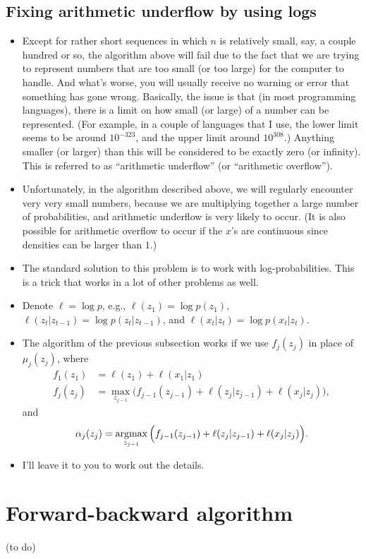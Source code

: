 \documentclass[12pt]{article}
\begin{document}
\subsection{Fixing arithmetic underflow by using logs}
\begin{itemize}
\item Except for rather short sequences in which $n$ is relatively small, say, a couple hundred or so, the algorithm above will fail due to the fact that we are trying to represent numbers that are too small (or too large) for the computer to handle. And what's worse, you will usually  receive no warning or error that something has gone wrong. Basically, the issue is that (in most programming languages), there is a limit on how small (or large) of a number can be represented. (For example, in a couple of languages that I use, the lower limit seems to be around $10^{-323}$, and the upper limit around $10^{308}$.) Anything smaller (or larger) than this will be considered to be exactly zero (or infinity). This is referred to as ``arithmetic underflow'' (or ``arithmetic overflow'').
\item Unfortunately, in the algorithm described above, we will regularly encounter very very small numbers, because we are multiplying together a large number of probabilities, and arithmetic underflow is very likely to occur.  (It is also possible for arithmetic overflow to occur if the $x$'s are continuous since densities can be larger than $1$.)
\item The standard solution to this problem is to work with log-probabilities. This is a trick that works in a lot of other problems as well.
\item Denote $\ell = \log p$, e.g., $\ell(z_1) = \log p(z_1)$, $\ell(z_t | z_{t -1}) = \log p(z_t | z_{t-1})$, and $\ell(x_t | z_t) = \log p(x_t | z_t)$.
\item The algorithm of the previous subsection works if we use $f_j(z_j)$ in place of $\mu_j(z_j)$, where
\begin{align*}
f_1(z_1) &= \ell(z_1) + \ell(x_1 | z_1) \\
f_j(z_j) &= \max_{z_{j-1}} \Big(f_{j-1}(z_{j-1}) + \ell(z_j | z_{j-1}) + \ell(x_j | z_j) \Big),
\end{align*}
and 
$$ \alpha_j(z_j) = \operatorname*{argmax}_{z_{j-1}} \Big(f_{j-1}(z_{j-1}) + \ell(z_j | z_{j-1}) + \ell(x_j | z_j) \Big).$$
\item I'll leave it to you to work out the details.
\end{itemize}






\section{Forward-backward algorithm}

(to do)
\end{document}
